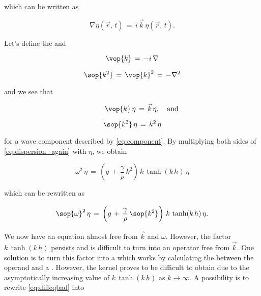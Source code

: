 which can be written as

\begin{equation}
\nabla\eta(\vec{r},\,t) \,=\, i\,\vec{k}\,\eta(\vec{r},\,t).
\end{equation}

Let's define the  and 

\begin{samepage}
\begin{equation} \label{eq:opkvec}
\vop{k} \,=\, -i\,\nabla
\end{equation}

\begin{equation} \label{eq:opk2}
\sop{k^2} \,=\, \vop{k}^2 \,=\, -\nabla^2
\end{equation}
\end{samepage}

and we see that 

\begin{samepage}
\begin{equation} \label{eq:opkvec1action}
\phantom{and}\quad\vop{k}\,\eta \,=\, \vec{k}\,\eta,\quad\text{and}
\end{equation}

\begin{equation} \label{eq:opk2action}
\sop{k^2}\,\eta \,=\, k^2\,\eta
\end{equation}
\end{samepage}

for a wave component described by \eqref{eq:component}. By multiplying both sides of \eqref{eq:dispersion_again} with $\eta$, we obtain

\begin{equation}
\omega^2\,\eta \,=\, \left(g\,+\,\frac{\gamma}{\rho}\,k^2\right)\,k\,\tanh(k\,h)\,\eta
\end{equation}

which can be rewritten as

\begin{equation} \label{eq:diffeqbad}
\sop{\omega}^2\,\eta \,=\, \left(g\,+\,\frac{\gamma}{\rho}\,\sop{k^2}\right)\,k\,\tanh(k\,h)\,\eta.
\end{equation}

We now have an equation almost free from $\vec{k}$ and $\omega$. However, the factor $k\,\tanh(k\,h)$ persists and is difficult to turn into an operator free from $\vec{k}$. One solution is to turn this factor into a  which works by calculating the  between the operand and a . However, the kernel proves to be difficult to obtain due to the asymptotically increasing value of $k\,\tanh(k\,h)$ as $k\rightarrow\infty$. A possibility is to rewrite \eqref{eq:diffeqbad} into

